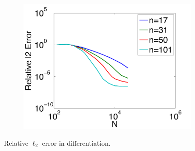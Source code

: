 \begin{figure}[htbp]
\begin{subfigure}[b]{0.425\textwidth}
\includegraphics[width=1.0\textwidth]{figures/chapter2/compare_weight_generation/xsfc_vs_xsfc_alt_on_sph32_times_sine_20x/direct_rel_l2_error.pdf}
	\end{subfigure}
	\caption{Relative $\ell_{2}$ error in differentiation.}
\end{figure}


